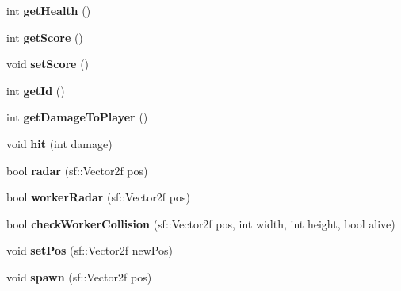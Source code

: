 \begin{DoxyCompactItemize}
int {\bfseries get\+Health} ()
\item 
\mbox{\label{class_alien___nest_ac32256e6a34173dded60894bc705c7e0}} 
int {\bfseries get\+Score} ()
\item 
\mbox{\label{class_alien___nest_a173230317cb5cd9923b4aaca6f997ba1}} 
void {\bfseries set\+Score} ()
\item 
\mbox{\label{class_alien___nest_ac7c5bce486f1f5c7970bb0edc6929ec0}} 
int {\bfseries get\+Id} ()
\item 
\mbox{\label{class_alien___nest_aeeb7dc26762b53af3f6c704e6239731a}} 
int {\bfseries get\+Damage\+To\+Player} ()
\item 
\mbox{\label{class_alien___nest_adf04a988d45b866ddd45d27f6d3d526c}} 
void {\bfseries hit} (int damage)
\item 
\mbox{\label{class_alien___nest_aa5db788eb8a1ad79a95fc149bb35d1e9}} 
bool {\bfseries radar} (sf\+::\+Vector2f pos)
\item 
\mbox{\label{class_alien___nest_a10a9977f3570dbf2d265cf9f4f908f4e}} 
bool {\bfseries worker\+Radar} (sf\+::\+Vector2f pos)
\item 
\mbox{\label{class_alien___nest_af3247982f459062107fb9f5042f52522}} 
bool {\bfseries check\+Worker\+Collision} (sf\+::\+Vector2f pos, int width, int height, bool alive)
\item 
\mbox{\label{class_alien___nest_a4e5723aa90a545823ea46b9019579255}} 
void {\bfseries set\+Pos} (sf\+::\+Vector2f new\+Pos)
\item 
\mbox{\label{class_alien___nest_a30b3307cd3508c5c2e64c07f8353fa12}} 
void {\bfseries spawn} (sf\+::\+Vector2f pos)
\end{DoxyCompactItemize}
